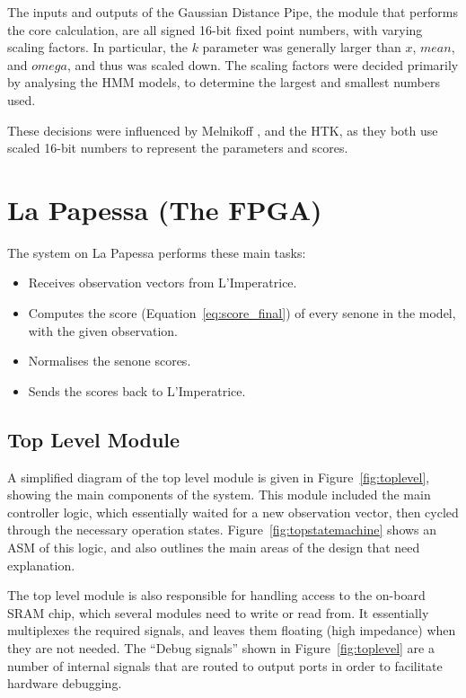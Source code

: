 	The inputs and outputs of the Gaussian Distance Pipe, the module that performs the core calculation, are all signed 16-bit fixed point numbers, with varying scaling factors.  In particular, the $k$ parameter was generally larger than $x$, $mean$, and $omega$, and thus was scaled down.  The scaling factors were decided primarily by analysing the HMM models, to determine the largest and smallest numbers used.

	These decisions were influenced by Melnikoff \cite{melnikoff2003speech}, and the HTK, as they both use scaled 16-bit numbers to represent the parameters and scores.


\section{La Papessa (The FPGA)} %
\label{sec:la_papessa_fpga}

	The system on La Papessa performs these main tasks:
	\begin{itemize}
		\item Receives observation vectors from L'Imperatrice.
		\item Computes the score (Equation~\ref{eq:score_final}) of every senone in the model, with the given observation.
		\item Normalises the senone scores.
		\item Sends the scores back to L'Imperatrice.
	\end{itemize}

	\subsection{Top Level Module} %
	\label{sub:top_level_module}
		A simplified diagram of the top level module is given in Figure~\ref{fig:toplevel}, showing the main components of the system.  This module included the main controller logic, which essentially waited for a new observation vector, then cycled through the necessary operation states.  Figure~\ref{fig:topstatemachine} shows an ASM of this logic, and also outlines the main areas of the design that need explanation.

		The top level module is also responsible for handling access to the on-board SRAM chip, which several modules need to write or read from.  It essentially multiplexes the required signals, and leaves them floating (high impedance) when they are not needed.  The ``Debug signals'' shown in Figure~\ref{fig:toplevel} are a number of internal signals that are routed to output ports in order to facilitate hardware debugging.

